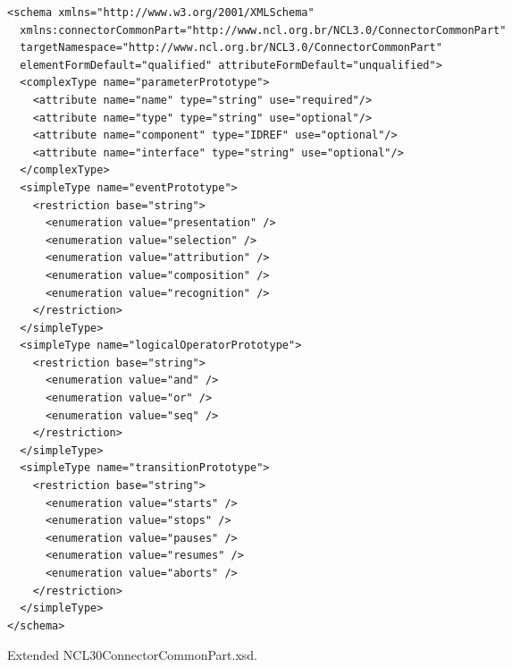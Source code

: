 \begin{listing}[!ht]
\begin{verbatim}
<schema xmlns="http://www.w3.org/2001/XMLSchema"
  xmlns:connectorCommonPart="http://www.ncl.org.br/NCL3.0/ConnectorCommonPart"
  targetNamespace="http://www.ncl.org.br/NCL3.0/ConnectorCommonPart"
  elementFormDefault="qualified" attributeFormDefault="unqualified">
  <complexType name="parameterPrototype">
    <attribute name="name" type="string" use="required"/>
    <attribute name="type" type="string" use="optional"/>
    <attribute name="component" type="IDREF" use="optional"/>
    <attribute name="interface" type="string" use="optional"/>
  </complexType>
  <simpleType name="eventPrototype">
    <restriction base="string">
      <enumeration value="presentation" />
      <enumeration value="selection" />
      <enumeration value="attribution" />
      <enumeration value="composition" />
      <enumeration value="recognition" />
    </restriction>
  </simpleType>
  <simpleType name="logicalOperatorPrototype">
    <restriction base="string">
      <enumeration value="and" />
      <enumeration value="or" />
      <enumeration value="seq" />
    </restriction>
  </simpleType>
  <simpleType name="transitionPrototype">
    <restriction base="string">
      <enumeration value="starts" />
      <enumeration value="stops" />
      <enumeration value="pauses" />
      <enumeration value="resumes" />
      <enumeration value="aborts" />
    </restriction>
  </simpleType>
</schema>
\end{verbatim}
\caption{Extended NCL30ConnectorCommonPart.xsd.}
\label{list:annexa3}
\end{listing}


